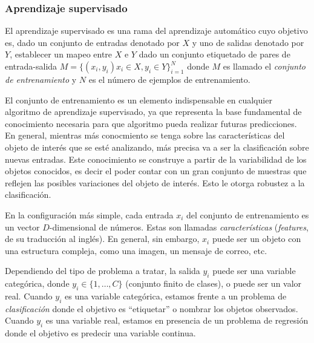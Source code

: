	

	
	\subsubsection{Aprendizaje supervisado}
	
	El aprendizaje supervisado es una rama del aprendizaje automático cuyo objetivo es, dado un conjunto de entradas denotado por $X$ y uno de salidas denotado por $Y$, establecer un mapeo entre $X$ e $Y$ dado un conjunto etiquetado de pares de entrada-salida $M=\{(x_i,y_i) x_i \in X, y_i \in Y \}^{N}_{i=1}$ donde $M$ es llamado el \textit{conjunto de entrenamiento} y $N$ es el número de ejemplos de entrenamiento.
	
	El conjunto de entrenamiento es un elemento indispensable en cualquier algoritmo de aprendizaje supervisado, ya que representa la base fundamental de conocimiento necesaria para que algoritmo pueda realizar futuras predicciones. En general, mientras más conocmiento se tenga sobre las características del objeto de interés que se esté analizando, más precisa va a ser la clasificación sobre nuevas entradas. Este conocimiento se construye a partir de la variabilidad de los objetos conocidos, es decir el poder contar con un gran conjunto de muestras que reflejen las posibles variaciones del objeto de interés. Esto le otorga robustez a la clasificación.
	
	En la configuración más simple, cada entrada $x_i$ del conjunto de entrenamiento es un vector $D$-dimensional de números. Estas son llamadas \textit{características} (\textit{features}, de su traducción al inglés). En general, sin embargo, $x_i$ puede ser un objeto con una estructura compleja, como una imagen, un mensaje de correo, etc.
	
	Dependiendo del tipo de problema a tratar, la salida $y_i$ puede ser una variable categórica, donde $y_i \in \{1,\dots,C\}$ (conjunto finito de clases), o puede ser un valor real. Cuando $y_i$ es una variable categórica, estamos frente a un problema de \textit{clasificación} donde el objetivo es ``etiquetar'' o nombrar los objetos observados. Cuando $y_i$ es una variable real, estamos en presencia de un problema de regresión donde el objetivo es predecir una variable continua.
	
